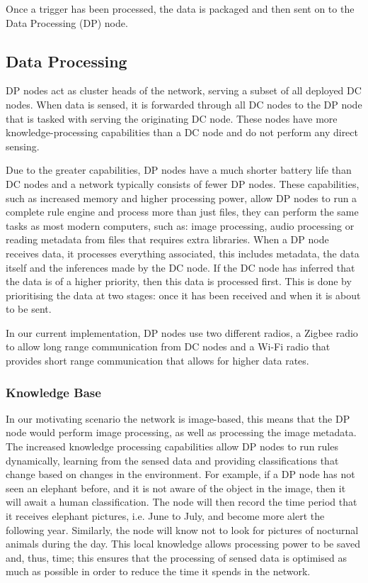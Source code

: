Once a trigger has been processed, the data is packaged and then sent on to the Data Processing (DP) node.

	\subsection{Data Processing}
	DP nodes act as cluster heads of the network, serving a subset of all deployed DC nodes. When data is sensed, it is forwarded through all DC nodes to the DP node that is tasked with serving the originating DC node. These nodes have more knowledge-processing capabilities than a DC node and do not perform any direct sensing. 

	Due to the greater capabilities, DP nodes have a much shorter battery life than DC nodes and a network typically consists of fewer DP nodes. These capabilities, such as increased memory and higher processing power, allow DP nodes to run a complete rule engine and process more than just files, they can perform the same tasks as most modern computers, such as: image processing, audio processing or reading metadata from files that requires extra libraries. When a DP node receives data, it processes everything associated, this includes metadata, the data itself and the inferences made by the DC node. If the DC node has inferred that the data is of a higher priority, then this data is processed first. This is done by prioritising the data at two stages: once it has been received and when it is about to be sent.

	In our current implementation, DP nodes use two different radios, a Zigbee radio to allow long range communication from DC nodes and a Wi-Fi radio that provides short range communication that allows for higher data rates.

	\subsubsection{Knowledge Base}
	In our motivating scenario the network is image-based, this means that the DP node would perform image processing, as well as processing the image metadata. The increased knowledge processing capabilities allow DP nodes to run rules dynamically, learning from the sensed data and providing classifications that change based on changes in the environment. For example, if a DP node has not seen an elephant before, and it is not aware of the object in the image, then it will await a human classification. The node will then record the time period that it receives elephant pictures, i.e. June to July, and become more alert the following year. Similarly, the node will know not to look for pictures of nocturnal animals during the day. This local knowledge allows processing power to be saved and, thus, time; this ensures that the processing of sensed data is optimised as much as possible in order to reduce the time it spends in the network.
	
